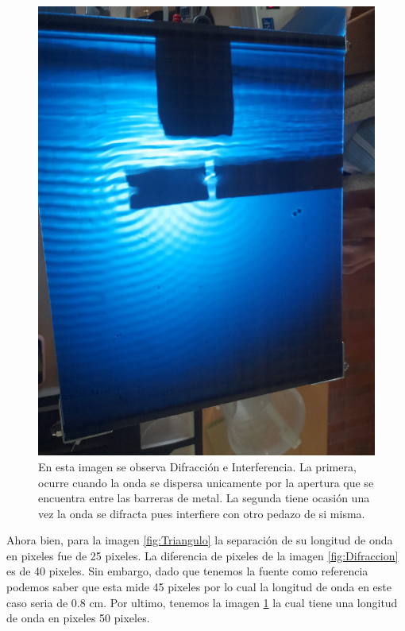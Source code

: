\documentclass[a4paper, amsfonts, amssymb, amsmath, reprint, showkeys, nofootinbib, twoside]{revtex4-1}
\begin{document}
        \begin{figure}[h]
          \centering
          \includegraphics[scale=0.1]{Difraccion_2.jpeg}
          \caption{En esta imagen se observa Difracción e Interferencia. La primera, ocurre cuando la onda se dispersa unicamente por la apertura que se encuentra entre las barreras de metal. La segunda tiene ocasión una vez la onda se difracta pues interfiere con otro pedazo de si misma.}\label{fig:Difraccion2}
        \end{figure}

        Ahora bien, para la imagen \ref{fig:Triangulo} la separación de su longitud de onda en pixeles fue de 25 pixeles. La diferencia de pixeles de la imagen \ref{fig:Difraccion} es de 40 pixeles. Sin embargo, dado que tenemos la fuente como referencia podemos saber que esta mide 45 pixeles por lo cual la longitud de onda en este caso seria de 0.8 cm. Por ultimo, tenemos la imagen \ref{fig:Difraccion2} la cual tiene una longitud de onda en pixeles 50 pixeles.
\end{document}
